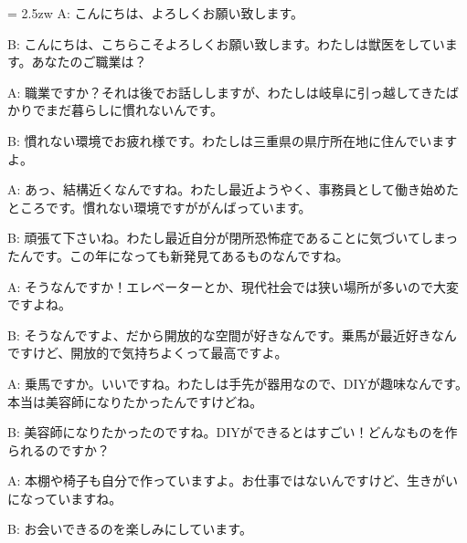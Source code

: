 \documentclass[11pt]{amsart}
\title{}
\author{}
\newenvironment{hangall}[1]{\hangindent = 2.5zw\everypar{\hangindent = 2.5zw}}{}
\begin{document}
\maketitle
\begin{hangall}{}%
A: こんにちは、よろしくお願い致します。



B: こんにちは、こちらこそよろしくお願い致します。わたしは獣医をしています。あなたのご職業は？



A: 職業ですか？それは後でお話ししますが、わたしは岐阜に引っ越してきたばかりでまだ暮らしに慣れないんです。



B: 慣れない環境でお疲れ様です。わたしは三重県の県庁所在地に住んでいますよ。



A: あっ、結構近くなんですね。わたし最近ようやく、事務員として働き始めたところです。慣れない環境ですががんばっています。



B: 頑張て下さいね。わたし最近自分が閉所恐怖症であることに気づいてしまったんです。この年になっても新発見てあるものなんですね。



A: そうなんですか！エレベーターとか、現代社会では狭い場所が多いので大変ですよね。



B: そうなんですよ、だから開放的な空間が好きなんです。乗馬が最近好きなんですけど、開放的で気持ちよくって最高ですよ。



A: 乗馬ですか。いいですね。わたしは手先が器用なので、DIYが趣味なんです。本当は美容師になりたかったんですけどね。



B: 美容師になりたかったのですね。DIYができるとはすごい！どんなものを作られるのですか？



A: 本棚や椅子も自分で作っていますよ。お仕事ではないんですけど、生きがいになっていますね。



B: お会いできるのを楽しみにしています。\end{hangall}
\end{document}

